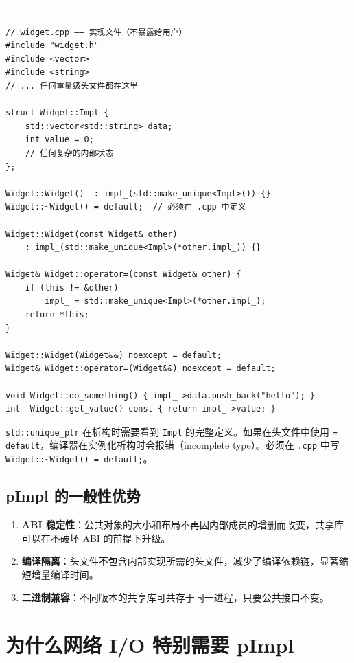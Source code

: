 \documentclass[12pt,a4paper,fontset=fandol]{ctexbook}
\newcommand{\Tp}[1]{\texttt{#1}}
\newcommand{\pimplabel}{%
  \noindent\begin{tcolorbox}[sharp corners,colback=pimplheadbg,colframe=pimplheadbg,
    left=6pt,right=6pt,top=2pt,bottom=2pt,boxrule=0pt]
  \textcolor{white}{\small\bfseries\sffamily pImpl}\end{tcolorbox}%
}
\begin{document}
\pimplabel
\begin{lstlisting}
// widget.cpp —— 实现文件（不暴露给用户）
#include "widget.h"
#include <vector>
#include <string>
// ... 任何重量级头文件都在这里

struct Widget::Impl {
    std::vector<std::string> data;
    int value = 0;
    // 任何复杂的内部状态
};

Widget::Widget()  : impl_(std::make_unique<Impl>()) {}
Widget::~Widget() = default;  // 必须在 .cpp 中定义

Widget::Widget(const Widget& other)
    : impl_(std::make_unique<Impl>(*other.impl_)) {}

Widget& Widget::operator=(const Widget& other) {
    if (this != &other)
        impl_ = std::make_unique<Impl>(*other.impl_);
    return *this;
}

Widget::Widget(Widget&&) noexcept = default;
Widget& Widget::operator=(Widget&&) noexcept = default;

void Widget::do_something() { impl_->data.push_back("hello"); }
int  Widget::get_value() const { return impl_->value; }
\end{lstlisting}

\begin{warning}[title=析构函数必须在 .cpp 中定义]
\Tp{std::unique\_ptr} 在析构时需要看到 \Tp{Impl} 的完整定义。如果在头文件中使用 \Tp{= default}，编译器在实例化析构时会报错（incomplete type）。必须在 \Tp{.cpp} 中写 \Tp{Widget::\textasciitilde Widget() = default;}。
\end{warning}

\subsection{pImpl 的一般性优势}

\begin{enumerate}
\item \textbf{ABI 稳定性}：公共对象的大小和布局不再因内部成员的增删而改变，共享库可以在不破坏 ABI 的前提下升级。
\item \textbf{编译隔离}：头文件不包含内部实现所需的头文件，减少了编译依赖链，显著缩短增量编译时间。
\item \textbf{二进制兼容}：不同版本的共享库可共存于同一进程，只要公共接口不变。
\end{enumerate}

\section{为什么网络 I/O 特别需要 pImpl}
\end{document}
